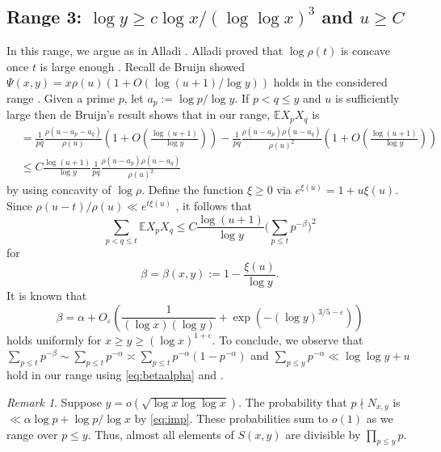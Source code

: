 \documentclass{amsart}
\theoremstyle{plain}
\theoremstyle{remark}
\newtheorem{rem}{Remark}
\newcommand{\EE}{\mathbb{E}}
\begin{document}
		\subsection{Range 3: $\log y \ge c \log x/(\log \log x)^3$ and $u \ge C$}
		In this range, we argue as in Alladi \cite{AlladiTuran}. Alladi proved that $\log \rho(t)$ is concave once $t$ is large enough \cite[Lem.~4]{AlladiTuran}. Recall de Bruijn showed $\Psi(x,y) = x\rho(u)(1+O(\log (u+1)/\log y))$ holds in the considered range \cite{db}. Given a prime $p$, let $a_p := \log p /\log y$. If $p<q\le y$ and $u$ is sufficiently large then de Bruijn's result shows that in our range, $\EE X_p X_q$ is
		\begin{align*}
			&= \frac{1}{pq} \frac{\rho(u-a_p-a_q)}{\rho(u)}\left(1+O\left(\frac{\log(u+1)}{\log y}\right)\right) - \frac{1}{pq}\frac{\rho(u-a_p)\rho(u-a_q)}{\rho(u)^2}\left(1+O\left(\frac{\log(u+1)}{\log y}\right)\right) \\
			&\le C \frac{\log(u+1)}{\log y}\frac{1}{pq}  \frac{\rho(u-a_p)\rho(u-a_q)}{\rho(u)^2}
		\end{align*}
		by using  concavity of $\log \rho$. Define the function $\xi\ge 0$ via $e^{\xi(u)}=1+u\xi(u)$. Since $\rho(u-t)/\rho(u) \ll e^{t\xi(u)}$ \cite[Cor.~2.4]{HT1993}, it follows that
		\[ \sum_{p<q \le t}\EE X_p X_q \le C \frac{\log(u+1)}{\log y} \big(\sum_{p \le t} p^{-\beta}\big)^2\]
		for
		\begin{equation}\label{eq:betadef}
			\beta=\beta(x,y):=1-\frac{\xi(u)}{\log y}.
		\end{equation}
		It is known that \cite[Eq.~(7.8)]{HildebrandTenenbaum1986}
		\begin{equation}\label{eq:betaalpha}
			\beta= \alpha +O_{\varepsilon}\left(\frac{1}{(\log x)( \log y)} + \exp(-(\log y)^{3/5-\varepsilon})\right)
		\end{equation}
		holds uniformly for $x \ge y \ge (\log x)^{1+\varepsilon}$. To conclude, we observe that $\sum_{p\le t}p^{-\beta} \sim \sum_{p \le t}p^{-\alpha} \asymp \sum_{p\le t} p^{-\alpha}(1-p^{-\alpha})$ and $\sum_{p \le y}p^{-\alpha} \ll \log \log y + u$ hold in our range using \eqref{eq:betaalpha}
		and \cite[Lem.~3.6]{DLBT20052}.
		\begin{rem}
			Suppose $y=o(\sqrt{\log x \log \log x})$. The probability that $p \nmid N_{x,y}$ is $\ll \alpha \log p + \log p/ \log x$ by \eqref{eq:imp}. These probabilities sum to $o(1)$ as we range over $p\le y$. Thus, almost all elements of $S(x,y)$ are divisible by $\prod_{p \le y}p$.
		\end{rem}
\end{document}
